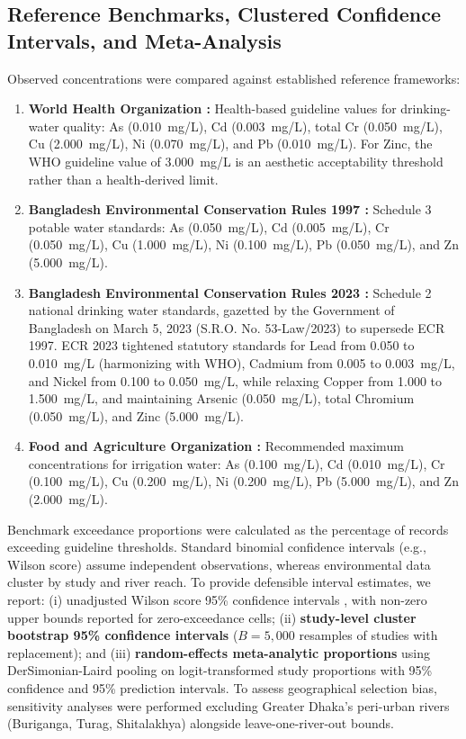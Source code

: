 \documentclass[authoryear,preprint,12pt]{elsarticle}
\begin{document}
\subsection{Reference Benchmarks, Clustered Confidence Intervals, and Meta-Analysis}
Observed concentrations were compared against established reference frameworks:
\begin{enumerate}
    \item \textbf{World Health Organization \citep{WHO2022}:} Health-based guideline values for drinking-water quality: As (0.010~mg/L), Cd (0.003~mg/L), total Cr (0.050~mg/L), Cu (2.000~mg/L), Ni (0.070~mg/L), and Pb (0.010~mg/L). For Zinc, the WHO guideline value of 3.000~mg/L is an aesthetic acceptability threshold rather than a health-derived limit.
    \item \textbf{Bangladesh Environmental Conservation Rules 1997 \citep{ECR1997}:} Schedule 3 potable water standards: As (0.050~mg/L), Cd (0.005~mg/L), Cr (0.050~mg/L), Cu (1.000~mg/L), Ni (0.100~mg/L), Pb (0.050~mg/L), and Zn (5.000~mg/L).
    \item \textbf{Bangladesh Environmental Conservation Rules 2023 \citep{ECR2023}:} Schedule 2 national drinking water standards, gazetted by the Government of Bangladesh on March 5, 2023 (S.R.O. No. 53-Law/2023) to supersede ECR 1997. ECR 2023 tightened statutory standards for Lead from 0.050 to 0.010~mg/L (harmonizing with WHO), Cadmium from 0.005 to 0.003~mg/L, and Nickel from 0.100 to 0.050~mg/L, while relaxing Copper from 1.000 to 1.500~mg/L, and maintaining Arsenic (0.050~mg/L), total Chromium (0.050~mg/L), and Zinc (5.000~mg/L).
    \item \textbf{Food and Agriculture Organization \citep{FAO1985}:} Recommended maximum concentrations for irrigation water: As (0.100~mg/L), Cd (0.010~mg/L), Cr (0.100~mg/L), Cu (0.200~mg/L), Ni (0.200~mg/L), Pb (5.000~mg/L), and Zn (2.000~mg/L).
\end{enumerate}

Benchmark exceedance proportions were calculated as the percentage of records exceeding guideline thresholds. Standard binomial confidence intervals (e.g., Wilson score) assume independent observations, whereas environmental data cluster by study and river reach. To provide defensible interval estimates, we report: (i) unadjusted Wilson score 95\% confidence intervals \citep{Wilson1927}, with non-zero upper bounds reported for zero-exceedance cells; (ii) \textbf{study-level cluster bootstrap 95\% confidence intervals} ($B=5,000$ resamples of studies with replacement); and (iii) \textbf{random-effects meta-analytic proportions} using DerSimonian-Laird pooling on logit-transformed study proportions with 95\% confidence and 95\% prediction intervals. To assess geographical selection bias, sensitivity analyses were performed excluding Greater Dhaka's peri-urban rivers (Buriganga, Turag, Shitalakhya) alongside leave-one-river-out bounds.
\end{document}
